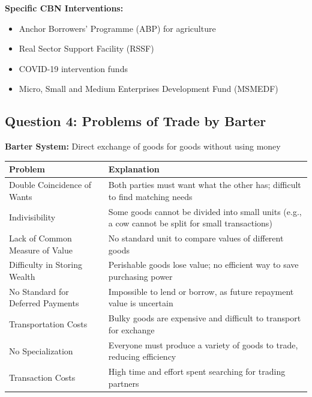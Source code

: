\documentclass[12pt,a4paper]{article}
\begin{document}
\textbf{Specific CBN Interventions:}
\begin{itemize}
    \item Anchor Borrowers' Programme (ABP) for agriculture
    \item Real Sector Support Facility (RSSF)
    \item COVID-19 intervention funds
    \item Micro, Small and Medium Enterprises Development Fund (MSMEDF)
\end{itemize}


\subsection{Question 4: Problems of Trade by Barter}

\textbf{Barter System:} Direct exchange of goods for goods without using money

\begin{center}
\begin{tabular}{@{}p{4cm}p{10cm}@{}}
\toprule
\textbf{Problem} & \textbf{Explanation} \\
\midrule
Double Coincidence of Wants & Both parties must want what the other has; difficult to find matching needs \\
\addlinespace
Indivisibility & Some goods cannot be divided into small units (e.g., a cow cannot be split for small transactions) \\
\addlinespace
Lack of Common Measure of Value & No standard unit to compare values of different goods \\
\addlinespace
Difficulty in Storing Wealth & Perishable goods lose value; no efficient way to save purchasing power \\
\addlinespace
No Standard for Deferred Payments & Impossible to lend or borrow, as future repayment value is uncertain \\
\addlinespace
Transportation Costs & Bulky goods are expensive and difficult to transport for exchange \\
\addlinespace
No Specialization & Everyone must produce a variety of goods to trade, reducing efficiency \\
\addlinespace
Transaction Costs & High time and effort spent searching for trading partners \\
\bottomrule
\end{tabular}
\end{center}
\end{document}
